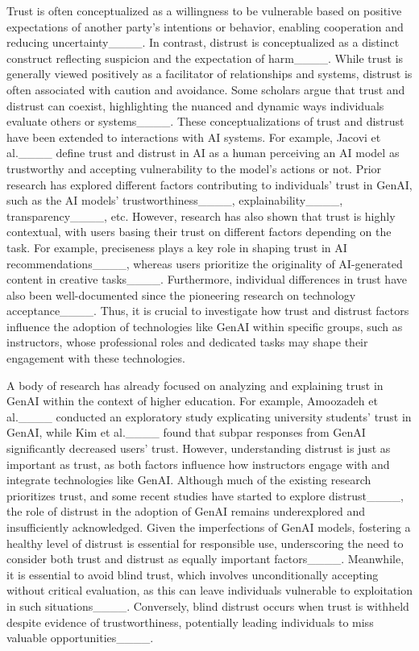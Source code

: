 Trust is often conceptualized as a willingness to be vulnerable based on positive expectations of another party’s intentions or behavior, enabling cooperation and reducing uncertainty____. In contrast, distrust is conceptualized as a distinct construct reflecting suspicion and the expectation of harm____. While trust is generally viewed positively as a facilitator of relationships and systems, distrust is often associated with caution and avoidance. Some scholars argue that trust and distrust can coexist, highlighting the nuanced and dynamic ways individuals evaluate others or systems____. These conceptualizations of trust and distrust have been extended to interactions with AI systems. For example, Jacovi et al.____ define trust and distrust in AI as a human perceiving an AI model as trustworthy and accepting vulnerability to the model's actions or not. Prior research has explored different factors contributing to individuals' trust in GenAI, such as the AI models' trustworthiness____, explainability____, transparency____, etc. However, research has also shown that trust is highly contextual, with users basing their trust on different factors depending on the task. For example, preciseness plays a key role in shaping trust in AI recommendations____, whereas users prioritize the originality of AI-generated content in creative tasks____. Furthermore, individual differences in trust have also been well-documented since the pioneering research on technology acceptance____. Thus, it is crucial to investigate how trust and distrust factors influence the adoption of technologies like GenAI within specific groups, such as instructors, whose professional roles and dedicated tasks may shape their engagement with these technologies.


A body of research has already focused on analyzing and explaining trust in GenAI within the context of higher education. For example, Amoozadeh et al.____ conducted an exploratory study explicating university students' trust in GenAI, while Kim et al.____ found that subpar responses from GenAI significantly decreased users' trust. However, understanding distrust is just as important as trust, as both factors influence how instructors engage with and integrate technologies like GenAI. Although much of the existing research prioritizes trust, and some recent studies have started to explore distrust____, the role of distrust in the adoption of GenAI remains underexplored and insufficiently acknowledged. Given the imperfections of GenAI models, fostering a healthy level of distrust is essential for responsible use, underscoring the need to consider both trust and distrust as equally important factors____. Meanwhile, it is essential to avoid blind trust, which involves unconditionally accepting without critical evaluation, as this can leave individuals vulnerable to exploitation in such situations____. Conversely, blind distrust occurs when trust is withheld despite evidence of trustworthiness, potentially leading individuals to miss valuable opportunities____. 

